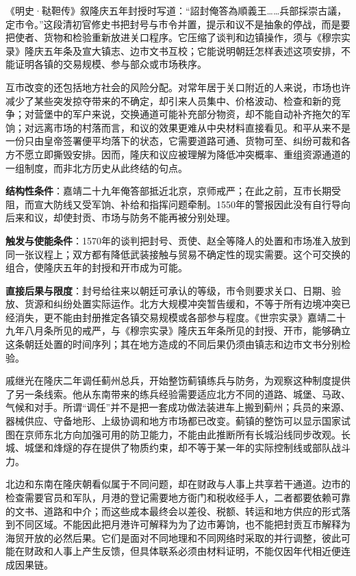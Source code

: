 \begin{textwindow}
《明史·鞑靼传》叙隆庆五年封授时写道：“詔封俺答為順義王……兵部採崇古議，定市令。”这段清初官修史书把封号与市令并置，提示和议不是抽象的停战，而是要把使者、货物和检验重新放进关口程序。它压缩了谈判和边镇操作，须与《穆宗实录》隆庆五年条及宣大镇志、边市文书互校；它能说明朝廷怎样表述这项安排，不能证明各镇的交易规模、参与部众或市场秩序。
\end{textwindow}

互市改变的还包括地方社会的风险分配。对常年居于关口附近的人来说，市场也许减少了某些突发掠夺带来的不确定，却引来人员集中、价格波动、检查和新的竞争；对营堡中的军户来说，交换通道可能补充部分物资，却不能自动补齐拖欠的军饷；对远离市场的村落而言，和议的效果更难从中央材料直接看见。和平从来不是一份只由皇帝签署便平均落下的状态，它需要道路可通、货物可至、纠纷可裁和各方不愿立即撕毁安排。因而，隆庆和议应被理解为降低冲突概率、重组资源通道的一组制度，而非北方历史从此终结的句点。

\begin{causalchain}
\textbf{结构性条件}：嘉靖二十九年俺答部抵近北京，京师戒严；在此之前，互市长期受阻，而宣大防线又受军饷、补给和指挥问题牵制。1550年的警报因此没有自行导向后来和议，却使封贡、市场与防务不能再被分别处理。

\textbf{触发与使能条件}：1570年的谈判把封号、贡使、赵全等降人的处置和市场准入放到同一张议程上；双方都有降低武装接触与贸易不确定性的现实需要。这个可交换的组合，使隆庆五年的封授和开市成为可能。

\textbf{直接后果与限度}：封号给往来以朝廷可承认的等级，市令则要求关口、日期、验放、货源和纠纷处置实际运作。北方大规模冲突暂告缓和，不等于所有边境冲突已经消失，更不能由封册推定各镇交易规模或各部参与程度。《世宗实录》嘉靖二十九年八月条所见的戒严，与《穆宗实录》隆庆五年条所见的封授、开市，能够确立这条朝廷处置的时间序列；其在地方造成的不同后果仍须由镇志和边市文书分别检验。
\end{causalchain}

戚继光在隆庆二年调任蓟州总兵，开始整饬蓟镇练兵与防务，为观察这种制度提供了另一条线索。他从东南带来的练兵经验需要适应北方不同的道路、城堡、马政、气候和对手。所谓“调任”并不是把一套成功做法装进车上搬到蓟州；兵员的来源、器械供应、守备地形、上级协调和地方市场都已改变。蓟镇的整饬可以显示国家试图在京师东北方向加强可用的防卫能力，不能由此推断所有长城沿线同步改观。长城、城堡和烽燧的存在提供了物质约束，却不等于某一年的实际控制线或部队战斗力。

北边和东南在隆庆朝看似属于不同问题，却在财政与人事上共享若干通道。边市的检查需要官员和军队，月港的登记需要地方衙门和税收经手人，二者都要依赖可靠的文书、道路和中介；而这些成本最终会以差役、税额、转运和地方供应的形式落到不同区域。不能因此把月港许可解释为为了边市筹饷，也不能把封贡互市解释为海贸开放的必然后果。它们是面对不同地理和不同网络时采取的并行调整，彼此可能在财政和人事上产生反馈，但具体联系必须由材料证明，不能仅因年代相近便连成因果链。

